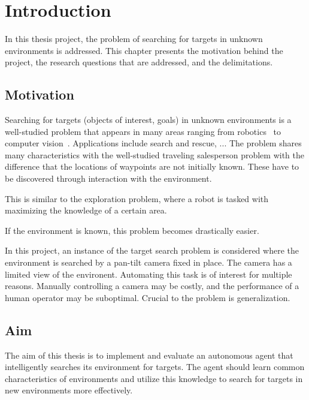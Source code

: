 \chapter{Introduction}
\label{cha:introduction}

In this thesis project, the problem of searching for targets in unknown environments is addressed. This chapter presents the motivation behind the project, the research questions that are addressed, and the delimitations. 

\section{Motivation}
\label{sec:motivation}

Searching for targets (objects of interest, goals) in unknown environments is a well-studied problem that appears in many areas ranging from robotics~\cite{} to computer vision~\cite{}. Applications include search and rescue, ... The problem shares many characteristics with the well-studied traveling salesperson problem with the difference that the locations of waypoints are not initially known. These have to be discovered through interaction with the environment.  

This is similar to the exploration problem, where a robot is tasked with maximizing the knowledge of a certain area.


If the environment is known, this problem becomes drastically easier.

In this project, an instance of the target search problem is considered where the environment is searched by a pan-tilt camera fixed in place. The camera has a limited view of the environent. Automating this task is of interest for multiple reasons. Manually controlling a camera may be costly, and the performance of a human operator may be suboptimal. Crucial to the problem is generalization.

\section{Aim}
\label{sec:aim}

The aim of this thesis is to implement and evaluate an autonomous agent that intelligently searches its environment for targets. The agent should learn common characteristics of environments and utilize this knowledge to search for targets in new environments more effectively. 

